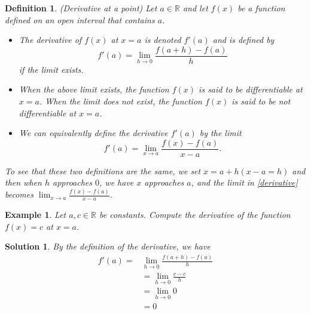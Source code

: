 \documentclass[12pt,a4paper]{book}
\newtheorem{Example}[theorem]{Example}
\numberwithin{equation}{section}
\newtheorem*{definition}{Definition}
\newtheorem*{solution}{{\bf Solution}}
\begin{document}
\begin{tcolorbox}[width=\textwidth,colback={green!20},title={},colbacktitle=yellow,coltitle=blue]
\begin{definition}(Derivative at a point)
Let $a\in\mathbb{R}$ and let $f(x)$ be a function defined on an open interval that contains $a$.
\begin{itemize}
\item The derivative of $f(x)$ at $x=a$ is denoted $f'(a)$ and is defined by 
\begin{equation}\label{derivative} f'(a)=\lim_{h\to 0}\frac{f(a+h)-f(a)}{h} \end{equation} if the limit exists. 
\item  When the above limit exists, the function $f(x)$ is said to be differentiable at $x=a$. When the limit 
does not exist, the function $f(x)$ is said to be not differentiable at $x=a$. 
\item We can equivalently define the derivative $f'(a)$  by the limit 
$$f'(a)=\lim_{x\to a} \frac{f(x)-f(a)}{x-a}.$$ 
\end{itemize}
To see that these two definitions are the same, we set $x=a+h (x-a=h)$ and then when $h$ approaches $0$, we have 
$x$ approaches $a$, and the limit in \ref{derivative} becomes 
$\lim_{x\to a} \frac{f(x)-f(a)}{x-a}.$
\end{definition}
\end{tcolorbox}
\begin{tcolorbox}[width=\textwidth,colback={green!20},title={},colbacktitle=yellow,coltitle=blue]
\begin{Example}
Let $a,c\in \mathbb{R}$ be constants. Compute the derivative of the function $f(x)=c$ at $x=a$. 
\end{Example}

\begin{solution}
By the definition of the derivative, we have
\begin{equation*}
\begin{split}
f'(a)=&\lim_{h\to 0}\frac{f(a+h)-f(a)}{h}\\
&= \lim_{h\to 0}\frac{c-c}{h}\\
&= \lim_{h\to 0}0\\
&=0
\end{split}
\end{equation*}
\end{solution}
\end{tcolorbox}
\end{document}
